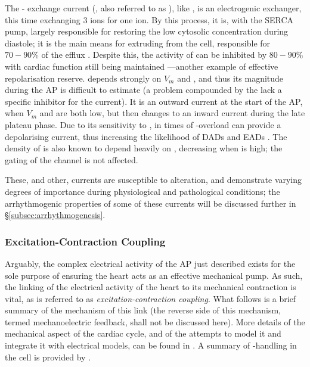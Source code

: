 \documentclass[../thesis-main.tex]{subfiles}
\begin{document}
 The \na{}-\ca{} exchange current (\inaca{}, also referred to as \incx{}), like \inak{}, is an electrogenic exchanger, this time exchanging 3 \na{} ions for one \ca{} ion. By this process, it is, with the SERCA pump, largely responsible for restoring the low cytosolic \ca{} concentration during diastole; it is the main means for extruding \ca{} from the cell, responsible for $70-90\%$ of the \ca{} efflux \citep{Eisner2004}. Despite this, the activity of \inaca{} can be inhibited by $80-90\%$ with cardiac function still being maintained \citep{Henderson2004}---another example of effective repolarisation reserve. \inaca{} depends strongly on $V_m$ and \cai{} \citep{Clusin1983}, and thus its magnitude during the AP is difficult to estimate (a problem compounded by the lack a specific inhibitor for the current). It is an outward current at the start of the AP, when $V_m$ and \cai{} are both low, but then changes to an inward current during the late plateau phase. Due to its sensitivity to \cai{}, in times of \ca{}-overload \inaca{} can provide a depolarising current, thus increasing the likelihood of DADs and EADs \citep{Clusin2003}. The density of \ina{} is also known to depend heavily on \cai{}, decreasing when \cai{} is high; the gating of the channel is not affected.
 
 These, and other, currents are susceptible to alteration, and demonstrate varying degrees of importance during physiological and pathological conditions; the arrhythmogenic properties of some of these currents will be discussed further in \S\ref{subsec:arrhythmogenesis}.
 
 \subsubsection{Excitation-Contraction Coupling}
 \label{subsubsec:ecc}
 Arguably, the complex electrical activity of the AP just described exists for the sole purpose of ensuring the heart acts as an effective mechanical pump. As such, the linking of the electrical activity of the heart to its mechanical contraction is vital, as is referred to as \emph{excitation-contraction coupling}. What follows is a brief summary of the mechanism of this link (the reverse side of this mechanism, termed mechanoelectric feedback, shall not be discussed here). More details of the mechanical aspect of the cardiac cycle, and of the attempts to model it and integrate it with electrical models, can be found in \citet{Trayanova2011}. A summary of \ca{}-handling in the cell is provided by \citet{Eisner2000}.
 
\end{document}
